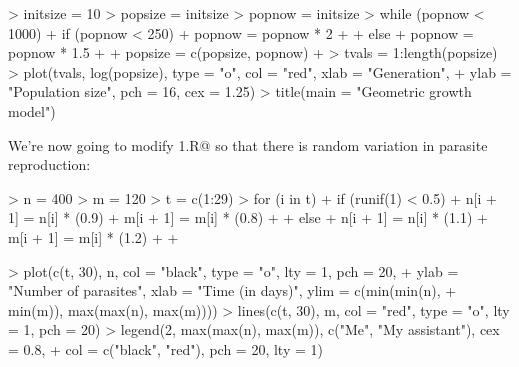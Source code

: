 \documentclass[11pt, oneside, reqno]{article}
\begin{document}
\begin{Schunk}
\begin{Sinput}
> initsize = 10
> popsize = initsize
> popnow = initsize
> while (popnow < 1000) {
+     if (popnow < 250) {
+         popnow = popnow * 2
+     }
+     else {
+         popnow = popnow * 1.5
+     }
+     popsize = c(popsize, popnow)
+ }
> tvals = 1:length(popsize)
> plot(tvals, log(popsize), type = "o", col = "red", xlab = "Generation", 
+     ylab = "Population size", pch = 16, cex = 1.25)
> title(main = "Geometric growth model")
\end{Sinput}
\end{Schunk}
\eans

We're now going to modify \verb@Parasite1.R@ so that there is random variation in parasite reproduction:

\begin{Schunk}
\begin{Sinput}
> n = 400
> m = 120
> t = c(1:29)
> for (i in t) {
+     if (runif(1) < 0.5) {
+         n[i + 1] = n[i] * (0.9)
+         m[i + 1] = m[i] * (0.8)
+     }
+     else {
+         n[i + 1] = n[i] * (1.1)
+         m[i + 1] = m[i] * (1.2)
+     }
+ }
\end{Sinput}
\end{Schunk}

\begin{Schunk}
\begin{Sinput}
> plot(c(t, 30), n, col = "black", type = "o", lty = 1, pch = 20, 
+     ylab = "Number of parasites", xlab = "Time (in days)", ylim = c(min(min(n), 
+         min(m)), max(max(n), max(m))))
> lines(c(t, 30), m, col = "red", type = "o", lty = 1, pch = 20)
> legend(2, max(max(n), max(m)), c("Me", "My assistant"), cex = 0.8, 
+     col = c("black", "red"), pch = 20, lty = 1)
\end{Sinput}
\end{Schunk}
\end{document}
